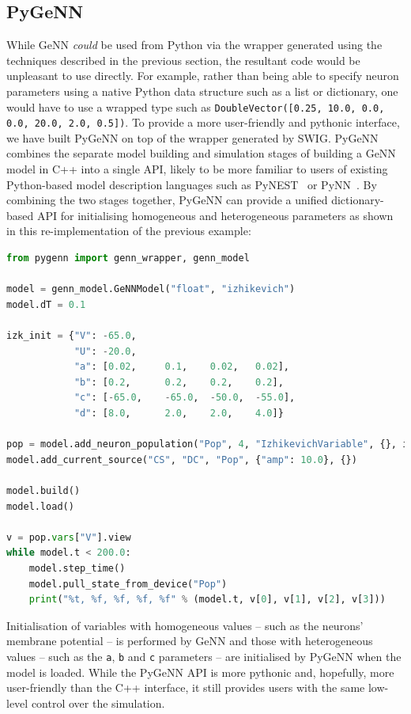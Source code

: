 \documentclass[utf8]{frontiersSCNS} %
\begin{document}
\subsection{PyGeNN}
\label{sec:methods/pygenn}
While GeNN \emph{could} be used from Python via the wrapper generated using the techniques described in the previous section, the resultant code would be unpleasant to use directly.
For example, rather than being able to specify neuron parameters using a native Python data structure such as a list or dictionary, one would have to use a wrapped type such as \lstinline{DoubleVector([0.25, 10.0, 0.0, 0.0, 20.0, 2.0, 0.5])}.
To provide a more user-friendly and pythonic interface, we have built PyGeNN on top of the wrapper generated by SWIG.
PyGeNN combines the separate model building and simulation stages of building a GeNN model in C++ into a single API, likely to be more familiar to users of existing Python-based model description languages such as PyNEST~\citep{Eppler2009} or PyNN~\citep{Davison2008}.
By combining the two stages together, PyGeNN can provide a unified dictionary-based API for initialising homogeneous and heterogeneous parameters as shown in this re-implementation of the previous example:
%
\begin{lstlisting}[language=Python]
from pygenn import genn_wrapper, genn_model

model = genn_model.GeNNModel("float", "izhikevich")
model.dT = 0.1

izk_init = {"V": -65.0,
            "U": -20.0,
            "a": [0.02,     0.1,    0.02,   0.02],
            "b": [0.2,      0.2,    0.2,    0.2],
            "c": [-65.0,    -65.0,  -50.0,  -55.0],
            "d": [8.0,      2.0,    2.0,    4.0]}

pop = model.add_neuron_population("Pop", 4, "IzhikevichVariable", {}, izk_init)
model.add_current_source("CS", "DC", "Pop", {"amp": 10.0}, {})

model.build()
model.load()

v = pop.vars["V"].view
while model.t < 200.0:
    model.step_time()
    model.pull_state_from_device("Pop")
    print("%t, %f, %f, %f, %f" % (model.t, v[0], v[1], v[2], v[3]))
\end{lstlisting}
%
Initialisation of variables with homogeneous values -- such as the neurons' membrane potential -- is performed by GeNN and those with heterogeneous values -- such as the \lstinline{a}, \lstinline{b} and \lstinline{c} parameters -- are initialised by PyGeNN when the model is loaded.
While the PyGeNN API is more pythonic and, hopefully, more user-friendly than the C++ interface, it still provides users with the same low-level control over the simulation.
\end{document}
